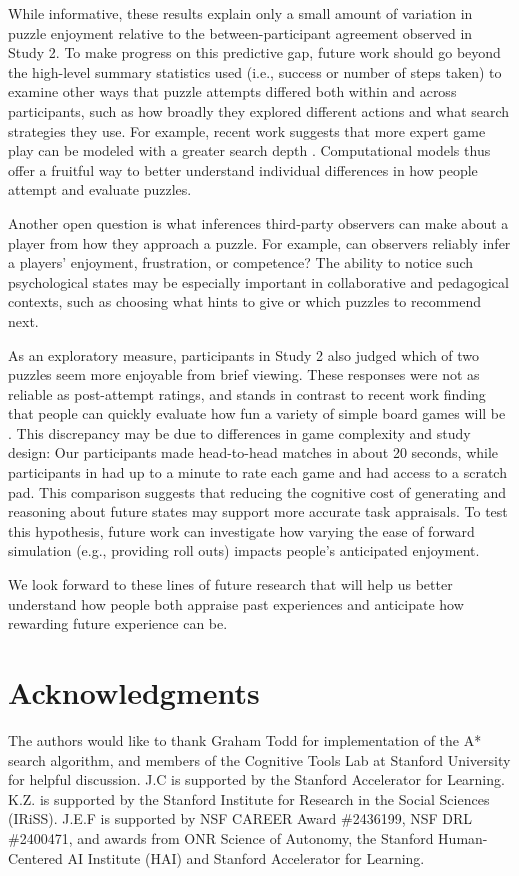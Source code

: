 \documentclass[10pt,letterpaper]{article}
\begin{document}
While informative, these results explain only a small amount of variation in puzzle enjoyment relative to the between-participant agreement observed in Study 2. %
To make progress on this predictive gap, future work should go beyond the high-level summary statistics used (i.e., success or number of steps taken) to examine other ways that puzzle attempts differed both within and across participants, such as how broadly they explored different actions and what search strategies they use. For example, recent work suggests that more expert game play can be modeled with a greater search depth \cite{vanOpheusden2023}. Computational models thus offer a fruitful way to better understand individual differences in how people attempt and evaluate puzzles. 

Another open question is what inferences third-party observers can make about a player from how they approach a puzzle. For example, can observers reliably infer a players' enjoyment, frustration, or competence? The ability to notice such psychological states may be especially important in collaborative and pedagogical contexts, such as choosing what hints to give or which puzzles to recommend next.

As an exploratory measure, participants in Study 2 also judged which of two puzzles seem more enjoyable from brief viewing. These responses were not as reliable as post-attempt ratings, and stands in contrast to recent work finding that people can quickly evaluate how fun a variety of simple board games will be \cite{zhang2024people}. 
This discrepancy may be due to differences in game complexity and study design: Our participants made head-to-head matches in about 20 seconds, while participants in \cite{zhang2024people} had up to a minute to rate each game and had access to a scratch pad. This comparison suggests that reducing the cognitive cost of generating and reasoning about future states may support more accurate task appraisals. To test this hypothesis, future work can investigate how varying the ease of forward simulation (e.g., providing roll outs) impacts people's anticipated enjoyment.

We look forward to these lines of future research that will help us better understand how people both appraise past experiences and anticipate how rewarding future experience can be.

\section{Acknowledgments}
The authors would like to thank Graham Todd for implementation of the A* search algorithm, and members of the Cognitive Tools Lab at Stanford University for helpful discussion. 
J.C is supported by the Stanford Accelerator for Learning. 
K.Z. is supported by the Stanford Institute for Research in the Social Sciences (IRiSS).
J.E.F is supported by NSF CAREER Award \#2436199, NSF DRL \#2400471, and awards from ONR Science of Autonomy, the Stanford Human-Centered AI Institute (HAI) and Stanford Accelerator for Learning.



\setlength{\bibleftmargin}{.125in}
\setlength{\bibindent}{-\bibleftmargin}



\end{document}

